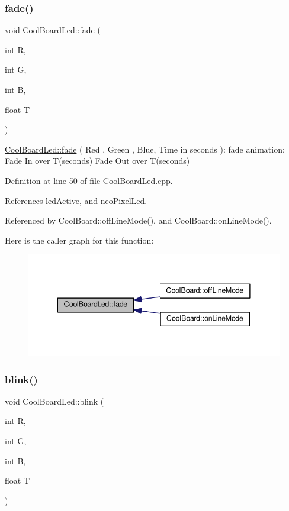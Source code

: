 \subsubsection{\texorpdfstring{fade()}{fade()}}
{\footnotesize\ttfamily void Cool\+Board\+Led\+::fade (\begin{DoxyParamCaption}\item[{int}]{R,  }\item[{int}]{G,  }\item[{int}]{B,  }\item[{float}]{T }\end{DoxyParamCaption})}

\hyperlink{class_cool_board_led_af1cacbaa88db8bcf6042c1083ba41155}{Cool\+Board\+Led\+::fade} ( Red , Green , Blue, Time in seconds )\+: fade animation\+: Fade In over T(seconds) Fade Out over T(seconds) 

Definition at line 50 of file Cool\+Board\+Led.\+cpp.



References led\+Active, and neo\+Pixel\+Led.



Referenced by Cool\+Board\+::off\+Line\+Mode(), and Cool\+Board\+::on\+Line\+Mode().

Here is the caller graph for this function\+:
\nopagebreak
\begin{figure}[H]
\begin{center}
\leavevmode
\includegraphics[width=341pt]{de/dc0/class_cool_board_led_af1cacbaa88db8bcf6042c1083ba41155_icgraph}
\end{center}
\end{figure}
\mbox{\label{class_cool_board_led_a96e1ea13003eee34c9dbcef340404426}} 
\subsubsection{\texorpdfstring{blink()}{blink()}}
{\footnotesize\ttfamily void Cool\+Board\+Led\+::blink (\begin{DoxyParamCaption}\item[{int}]{R,  }\item[{int}]{G,  }\item[{int}]{B,  }\item[{float}]{T }\end{DoxyParamCaption})}

